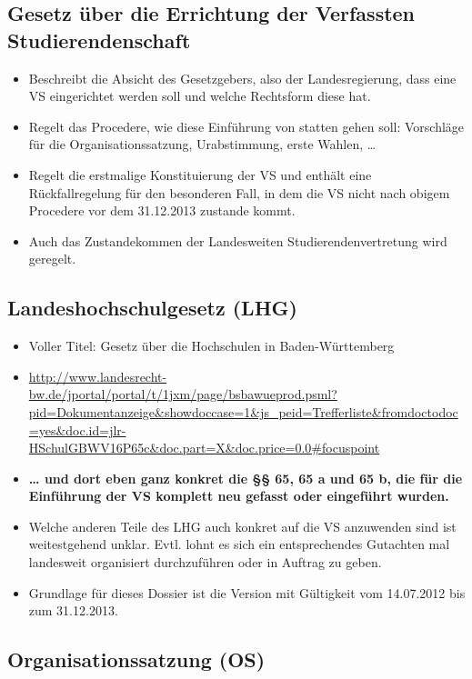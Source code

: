 \documentclass[
10pt,
a4paper,
twoside,								%
titlepage=false,							%
draft=false								%
]{scrartcl}
\begin{document}
\subsection{Gesetz über die Errichtung der Verfassten Studierendenschaft}

\begin{itemize}
	\item Beschreibt die Absicht des Gesetzgebers, also der Landesregierung, dass eine VS eingerichtet werden soll und welche Rechtsform diese hat.
	\item Regelt das Procedere, wie diese Einführung von statten gehen soll: Vorschläge für die Organisationssatzung, Urabstimmung, erste Wahlen, …
	\item Regelt die erstmalige Konstituierung der VS und enthält eine Rückfallregelung für den besonderen Fall, in dem die VS nicht nach obigem Procedere vor dem 31.12.2013 zustande kommt.
	\item Auch das Zustandekommen der Landesweiten Studierendenvertretung wird geregelt.
\end{itemize}


\subsection{Landeshochschulgesetz (LHG)}
\begin{itemize}
	\item Voller Titel: Gesetz über die Hochschulen in Baden-Württemberg
	\item \sloppy  \url{http://www.landesrecht-bw.de/jportal/portal/t/1jxm/page/bsbawueprod.psml?pid=Dokumentanzeige&showdoccase=1&js_peid=Trefferliste&fromdoctodoc=yes&doc.id=jlr-HSchulGBWV16P65c&doc.part=X&doc.price=0.0#focuspoint}
	\item \textbf{… und dort eben ganz konkret die §§ 65, 65 a und 65 b, die für die Einführung der VS komplett neu gefasst oder eingeführt wurden.}
	\item Welche anderen Teile des LHG auch konkret auf die VS anzuwenden sind ist weitestgehend unklar. Evtl. lohnt es sich ein entsprechendes Gutachten mal landesweit organisiert durchzuführen oder in Auftrag zu geben.
	\item Grundlage für dieses Dossier ist die Version mit Gültigkeit vom 14.07.2012 bis zum 31.12.2013.
\end{itemize}

\subsection{Organisationssatzung (OS)}
\end{document}

